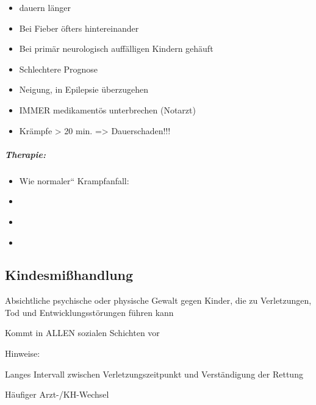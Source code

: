 \begin{itemize}
\item dauern länger

\item Bei Fieber öfters hintereinander

\item Bei primär neurologisch auffälligen Kindern  gehäuft

\item Schlechtere Prognose

\item Neigung, in Epilepsie \"uberzugehen

\item IMMER medikamentös unterbrechen  (Notarzt)

\item Krämpfe {\textgreater} 20 min. ={\textgreater} Dauerschaden!!! 

\end{itemize}
\subparagraph*{
Therapie:}

\begin{itemize}
\item {\mdseries\color[rgb]{0.0,0.0,0.5019608}
Wie {\quotedblbase}normaler{\textquotedblleft} Krampfanfall:}

\item \item {\mdseries\color[rgb]{0.0,0.0,0.5019608}
}

\item {\mdseries\color[rgb]{0.0,0.0,0.5019608}
}

\end{itemize}


\subsection{Kindesmi{\ss}handlung}

{\mdseries
Absichtliche psychische oder physische  Gewalt gegen Kinder, die zu 
Verletzungen, Tod und  Entwicklungsstörungen f\"uhren kann}

{\mdseries
Kommt in ALLEN sozialen Schichten vor}

{\mdseries
Hinweise:}

{\mdseries
Langes Intervall zwischen  Verletzungszeitpunkt und Verständigung der 
Rettung}

{\mdseries
Häufiger Arzt-/KH-Wechsel}

